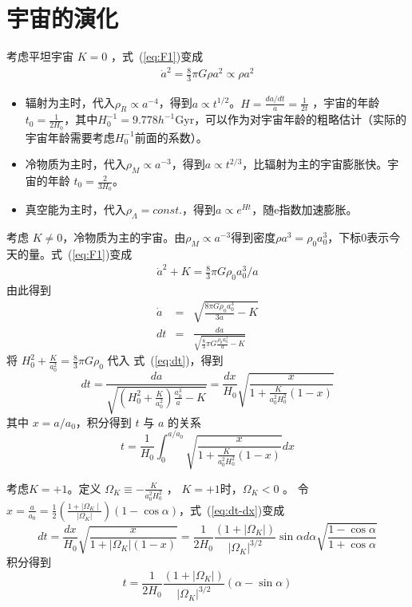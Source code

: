 \documentclass[12pt]{ctexart}
\newcommand{\refeq}[1]{式~(\ref{#1})}
\begin{document}
\section{宇宙的演化}

考虑平坦宇宙 $K=0$ ，\refeq{eq:F1}变成
\begin{eqnarray}
    \dot{a}^2 = \frac{8}{3} \pi G \rho a^2 \propto \rho a^2
\end{eqnarray} 

\begin{itemize}
    \item 辐射为主时，代入$\rho_R\propto a^{-4}$，得到$a\propto t^{1/2}$。$H=\frac{da/dt}{a}=\frac{1}{2t}$ ，宇宙的年龄 $t_0=\frac{1}{2H_0}$，其中$H_0^{-1}= 9.778 h^{-1} \mathrm{Gyr}$，可以作为对宇宙年龄的粗略估计（实际的宇宙年龄需要考虑$H_0^{-1}$前面的系数）。
    \item 冷物质为主时，代入$\rho_M\propto a^{-3}$，得到$a\propto t^{2/3}$，比辐射为主的宇宙膨胀快。宇宙的年龄 $t_0=\frac{2}{3H_0}$。
    \item 真空能为主时，代入$\rho_\Lambda =const.$，得到$a\propto e^{Ht}$，随e指数加速膨胀。
\end{itemize}

考虑 $K\neq 0$，冷物质为主的宇宙。由$\rho_M\propto a^{-3}$得到密度$\rho a^3 = \rho_0 a^3_0$，下标0表示今天的量。\refeq{eq:F1}变成
\begin{eqnarray}
    \dot{a}^2 + K = \frac{8}{3} \pi G \rho_0 a_0^3/a 
\end{eqnarray} 
由此得到
\begin{eqnarray}
    \dot{a}&=&\sqrt{\frac{8 \pi G \rho_{0} a_{0}^{3}}{3 a}-K} \\
    d t&=&\frac{d a}{\sqrt{\frac{8}{3} \pi G \frac{\rho_{0} a_{0}^{3}}{a}-K}} \label{eq:dt}
\end{eqnarray}
将 $H_0^2+\frac{K}{a_0^2}=\frac{8}{3}\pi G \rho_0$  代入 \refeq{eq:dt}，得到
\begin{equation}
    d t=\frac{d a}{\sqrt{\left(H_{0}^{2}+\frac{K}{a_{0}^{2}}\right) \frac{a_{0}^{3}}{a}-K}}=\frac{d x}{H_{0}} \sqrt{\frac{x}{1+\frac{K}{a_{0}^{2} H_{0}^{2}}(1-x)}} \label{eq:dt-dx}
\end{equation}
其中 $x=a/a_0$，积分得到 $t$ 与 $a$ 的关系 
\begin{equation}
    t=\frac{1}{H_{0}} \int_{0}^{a/a_{0}} \sqrt{\frac{x}{1+\frac{K}{a_{0}^{2} H_{0}^{2}}(1-x)}} d x
\end{equation}

考虑$K=+1$。定义 $\Omega_K \equiv -\frac{K}{a_0^2 H_0^2}$ ， $K=+1$时，$\Omega_K <0$ 。
令 $x=\frac{a}{a_{0}}=\frac{1}{2}\left(\frac{1+| \Omega_{K} \mid}{\left|\Omega_{K}\right|}\right)(1-\cos \alpha)$，\refeq{eq:dt-dx}变成
\begin{equation}
    d t=\frac{d x}{H_{0}} \sqrt{\frac{x}{1+\left|\Omega_{K}\right|(1-x)}}=\frac{1}{2 H_{0}} \frac{\left(1+\left|\Omega_{K}\right|\right)}{\left|\Omega_{K}\right|^{3 / 2}} \sin \alpha d \alpha \sqrt{\frac{1-\cos \alpha}{1+ \cos  \alpha}}
\end{equation}
积分得到
\begin{equation}
    t=\frac{1}{2 H_{0}} \frac{\left(1+\left|\Omega_{K}\right|\right)}{\left|\Omega_{K}\right|^{3 / 2}}(\alpha-\sin \alpha)
\end{equation}
\end{document}
